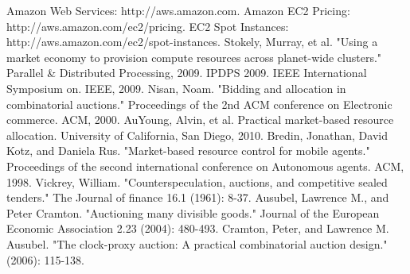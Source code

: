\documentclass[a4paper,11pt,twocolumn]{article}
\begin{document}

\begin{thebibliography}{99}
  Amazon Web Services: http://aws.amazon.com.
  Amazon EC2 Pricing: http://aws.amazon.com/ec2/pricing.
  EC2 Spot Instances: http://aws.amazon.com/ec2/spot-instances.
  Stokely, Murray, et al. "Using a market economy to provision compute resources across planet-wide clusters." Parallel \& Distributed Processing, 2009. IPDPS 2009. IEEE International Symposium on. IEEE, 2009.
  Nisan, Noam. "Bidding and allocation in combinatorial auctions." Proceedings of the 2nd ACM conference on Electronic commerce. ACM, 2000.
  AuYoung, Alvin, et al. Practical market-based resource allocation. University of California, San Diego, 2010.
  Bredin, Jonathan, David Kotz, and Daniela Rus. "Market-based resource control for mobile agents." Proceedings of the second international conference on Autonomous agents. ACM, 1998.
  Vickrey, William. "Counterspeculation, auctions, and competitive sealed tenders." The Journal of finance 16.1 (1961): 8-37.
  Ausubel, Lawrence M., and Peter Cramton. "Auctioning many divisible goods." Journal of the European Economic Association 2.23 (2004): 480-493.
  Cramton, Peter, and Lawrence M. Ausubel. "The clock-proxy auction: A practical combinatorial auction design." (2006): 115-138.
\end{thebibliography}
\end{document}
